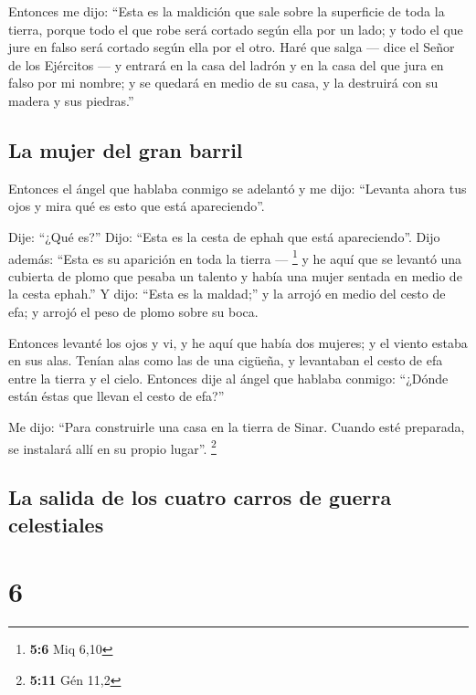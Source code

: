  Entonces me dijo: ``Esta es la maldición que sale sobre
la superficie de toda la tierra, porque todo el que robe será cortado
según ella por un lado; y todo el que jure en falso será cortado según
ella por el otro.  Haré que salga --- dice el Señor de los
Ejércitos --- y entrará en la casa del ladrón y en la casa del que jura
en falso por mi nombre; y se quedará en medio de su casa, y la destruirá
con su madera y sus piedras.''

\hypertarget{la-mujer-del-gran-barril}{%
\subsection{La mujer del gran barril}\label{la-mujer-del-gran-barril}}

 Entonces el ángel que hablaba conmigo se adelantó y me
dijo: ``Levanta ahora tus ojos y mira qué es esto que está
apareciendo''.

 Dije: ``¿Qué es?'' Dijo: ``Esta es la cesta de ephah que
está apareciendo''. Dijo además: ``Esta es su aparición en toda la
tierra --- \footnote{\textbf{5:6} Miq 6,10}  y he aquí que
se levantó una cubierta de plomo que pesaba un talento y había una mujer
sentada en medio de la cesta ephah.''  Y dijo: ``Esta es
la maldad;'' y la arrojó en medio del cesto de efa; y arrojó el peso de
plomo sobre su boca.

 Entonces levanté los ojos y vi, y he aquí que había dos
mujeres; y el viento estaba en sus alas. Tenían alas como las de una
cigüeña, y levantaban el cesto de efa entre la tierra y el cielo.
 Entonces dije al ángel que hablaba conmigo: ``¿Dónde
están éstas que llevan el cesto de efa?''

 Me dijo: ``Para construirle una casa en la tierra de
Sinar. Cuando esté preparada, se instalará allí en su propio lugar''.
\footnote{\textbf{5:11} Gén 11,2}

\hypertarget{la-salida-de-los-cuatro-carros-de-guerra-celestiales}{%
\subsection{La salida de los cuatro carros de guerra
celestiales}\label{la-salida-de-los-cuatro-carros-de-guerra-celestiales}}

\hypertarget{section-5}{%
\section{6}\label{section-5}}

